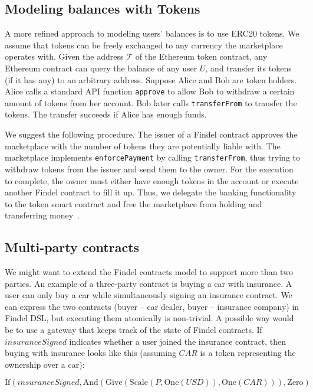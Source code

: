 \subsection{Modeling balances with Tokens}

A more refined approach to modeling users' balances is to use ERC20 tokens.
We assume that tokens can be freely exchanged to any currency the marketplace operates with.
Given the address $\mathcal{T}$ of the Ethereum token contract, any Ethereum contract can query the balance of any user $U$, and transfer its tokens (if it has any) to an arbitrary address.
Suppose Alice and Bob are token holders.
Alice calls a standard API function \texttt{approve} to allow Bob to withdraw a certain amount of tokens from her account.
Bob later calls \texttt{transferFrom} to transfer the tokens.
The transfer succeeds if Alice has enough funds.

We suggest the following procedure.
The issuer of a Findel contract approves the marketplace with the number of tokens they are potentially liable with.
The marketplace implements \texttt{enforcePayment} by calling \texttt{transferFrom}, thus trying to withdraw tokens from the issuer and send them to the owner.
For the execution to complete, the owner must either have enough tokens in the account or execute another Findel contract to fill it up.
Thus, we delegate the banking functionality to the token smart contract and free the marketplace from holding and transferring money~\cite{Khovratovich2016}.


\subsection{Multi-party contracts}

We might want to extend the Findel contracts model to support more than two parties.
An example of a three-party contract is buying a car with insurance.
A user can only buy a car while simultaneously signing an insurance contract.
We can express the two contracts (buyer -- car dealer, buyer -- insurance company) in Findel DSL, but executing them atomically is non-trivial.
A possible way would be to use a gateway that keeps track of the state of Findel contracts.
If \(insuranceSigned\) indicates whether a user joined the insurance contract, then buying with insurance looks like this (assuming \(CAR\) is a token representing the ownership over a car):

\[\mathrm{If}(insuranceSigned,\mathrm{And}(\mathrm{Give}(\mathrm{Scale}(P,\mathrm{One}(USD)),\mathrm{One}(CAR))),\mathrm{Zero})\]


